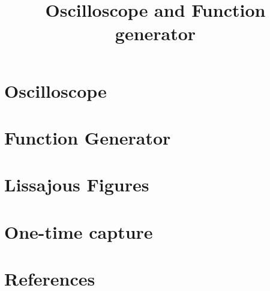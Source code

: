 \documentclass[12pt,oneside,letterpaper,english]{article}
\title{Oscilloscope and Function generator} %
\begin{document}


\newpage
\doublespacing
\renewcommand{\baselinestretch}{1}\normalsize
\tableofcontents
\renewcommand{\baselinestretch}{1}\normalsize
\thispagestyle{fancy} %

\newpage
{} 
\section{Oscilloscope} \label{ch1}
 
\label{EndOfText}


\section{Function Generator} \label{ch1}
 
\label{EndOfText}
\newpage
{} 
\section{Lissajous Figures} \label{ch1}
 
\label{EndOfText}
\label{endOfDoc}
\newpage
{} 
\section{One-time capture } \label{ch1}
 
\label{EndOfText}
\label{endOfDoc}
\newpage
{} 
\section{References} \label{ch1}
 
\label{EndOfText}
\label{endOfDoc}
\end{document}
